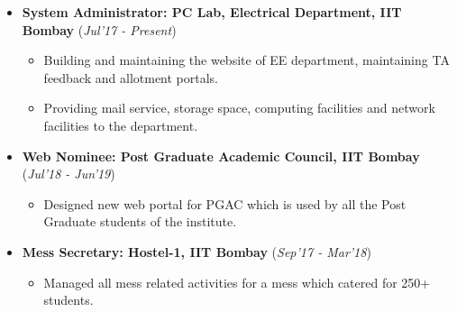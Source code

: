 \documentclass[10pt]{article}
\begin{document}
\begin{itemize}[leftmargin=0.4cm]
\vspace{-0.1cm}
\item \textbf {System Administrator: PC Lab, Electrical Department, IIT Bombay} 
\hfill{(\textit{Jul'17 - Present})}\\[-0.6cm]
    \begin{itemize}
	\item Building and maintaining the website of EE department, maintaining TA feedback and allotment portals.\vspace{-0.1cm}
	\item Providing mail service, storage space, computing facilities and network facilities to the department.\vspace{-0.1cm}

	\end{itemize}
	\vspace{-0.25cm}
	
	
\item \textbf{Web Nominee: Post Graduate Academic Council, IIT Bombay}
\hfill{(\textit{Jul'18 - Jun'19})}\\[-0.65cm]
    \begin{itemize}
			\item Designed new web portal for PGAC which is used by all the Post Graduate students of the institute. \vspace{-0.1cm}
		
		\end{itemize}
		\vspace{-0.25cm}

\item \textbf{Mess Secretary: Hostel-1, IIT Bombay}
\hfill{(\textit{Sep'17 - Mar'18})}\\[-0.65cm]
    \begin{itemize}
            \item Managed all mess related activities for a mess which catered for 250+ students. \vspace{-0.1cm}

		\end{itemize}
		\vspace{-0.2cm}	


    	
\end{itemize}
\vspace{0.15cm}
\end{document}
